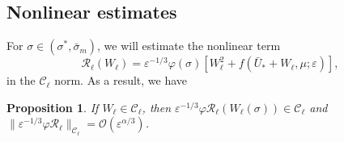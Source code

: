 \documentclass[letterpaper,11pt]{article}
\newcommand{\Ral}{\mathcal{R}}
\newcommand{\rmO}{\mathcal{O}}
\newcommand{\eps}{\varepsilon}
\numberwithin{equation}{section}
\theoremstyle{plain}
\newtheorem{proposition}[theorem]{Proposition}
\begin{document}
\subsection{Nonlinear estimates}

For $\sigma \in (\sigma^* , \bar{\sigma}_m)$, we will estimate the nonlinear term 
\[
\Ral_{\ell} (W_\ell)=\eps^{-1/3}\varphi(\sigma)\left[ W_\ell^2 + f(\bar{U}_*+W_\ell, \mu;\eps)\right],
\]
 in the $\mathcal{C}_\ell$ norm. As a result, we have

\begin{proposition}\label{nl_est_l}
If $W_\ell \in \mathcal{C}_{\ell}$, then $ \eps^{-1/3}\varphi \Ral_\ell(W_\ell(\sigma))  \in \mathcal{C}_\ell$ and $\| \eps^{-1/3}\varphi \Ral_\ell \|_{\mathcal{C}_\ell} = \rmO(\eps^{\alpha/3})$.
\end{proposition}
\end{document}
